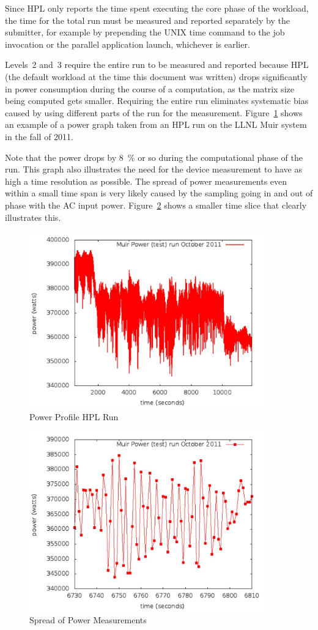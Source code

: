 Since \acs{HPL} only reports the time spent executing the core phase of the workload, the time for the total run must be measured and reported separately by the submitter, for example by prepending the UNIX time command to the job invocation or the parallel application launch, whichever is earlier.

Levels~2 and~3 require the entire run to be measured and reported because \acs{HPL} (the default workload at the time this document was written) drops significantly in power consumption during the course of a computation, as the matrix size being computed gets smaller.
Requiring the entire run eliminates systematic bias caused by using different parts of the run for the measurement.
Figure~\ref{fig:powprof} shows an example of a power graph taken from an \acs{HPL} run on the LLNL Muir system in the fall of 2011.

Note that the power drops by \SI{8}{\percent} or so during the computational phase of the run.
This graph also illustrates the need for the device measurement to have as high a time resolution as possible.
The spread of power measurements even within a small time span is very likely caused by the sampling going in and out of phase with the AC input power.
Figure~\ref{fig:sopm} shows a smaller time slice that clearly illustrates this.


\begin{figure}
\centering
\includegraphics[width=4in]{fig3-1}
\caption{Power Profile \acs{HPL} Run}
\label{fig:powprof}
\end{figure}

\begin{figure}
\centering
\includegraphics[width=4in]{fig3-2}
\caption{Spread of Power Measurements}
\label{fig:sopm}
\end{figure}

